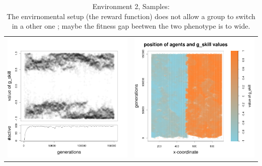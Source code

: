 \documentclass[a4paper,10pt]{article}
\begin{document}
\begin{table}[ht]
\caption{Environment 2, Samples:
	\\The envirnomental setup (the reward function) does not allow a group to switch in a other one ; maybe the fitness gap beetwen the two phenotype is to wide.
}
 \centering
 \begin{tabular}{cc}
 \includegraphics[width=\imgSize]{images/5StaticEnv/Gplot22_staticEnv2}&\includegraphics[width=\imgSize]{images/5StaticEnv/Gplot22Static_staticEnv2}\\

\end{tabular}
\end{table}
\end{document}
